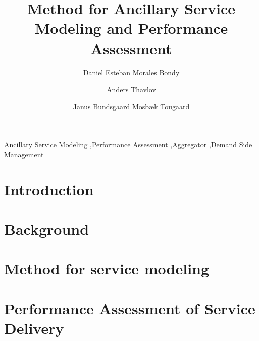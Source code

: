 \documentclass[review]{elsarticle}
\begin{document}
\title{Method for Ancillary Service Modeling and Performance Assessment}

%

\author[risoe]{Daniel Esteban Morales Bondy}

\author[risoe]{Anders Thavlov}

\author[lyngby]{Janus Bundsgaard Mosb\ae k Tougaard}


\address[risoe]{Department of Electrical Engineering, Technical University of Denmark, Frederiksborgvej 399, Building 776, 4000 Roskilde, Denmark}
\address[lyngby]{Department of Electrical Engineering, Technical University of Denmark, Elektrovej, Building 325, 2800 Kgs. Lyngby, Denmark}

\begin{abstract}

\end{abstract}
\begin{keyword}
Ancillary Service Modeling \sep Performance Assessment \sep Aggregator \sep Demand Side Management
\end{keyword}

\maketitle

\section{Introduction}


\section{Background}\label{sec:background}


\section{Method for service modeling}\label{sec:methodology}


\section{Performance Assessment of Service Delivery}\label{sec:performance}

\end{document}
